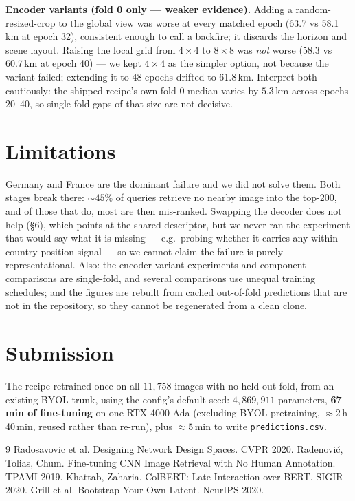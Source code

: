 \documentclass[10pt,a4paper,twocolumn]{article}
\begin{document}
\textbf{Encoder variants (fold 0 only --- weaker evidence).} Adding a
random-resized-crop to the global view was worse at every matched epoch
(63.7 vs 58.1\,km at epoch 32), consistent enough to call a backfire; it
discards the horizon and scene layout. Raising the local grid from
$4\!\times\!4$ to $8\!\times\!8$ was \emph{not} worse (58.3 vs 60.7\,km at
epoch 40) --- we kept $4\!\times\!4$ as the simpler option, not because the
variant failed; extending it to 48 epochs drifted to 61.8\,km. Interpret both
cautiously: the shipped recipe's own fold-0 median varies by $5.3$\,km across
epochs 20--40, so single-fold gaps of that size are not decisive.

\section{Limitations}

Germany and France are the dominant failure and we did not solve them. Both
stages break there: ${\sim}45\%$ of queries retrieve no nearby image into the
top-200, and of those that do, most are then mis-ranked. Swapping the decoder
does not help (\S6), which points at the shared descriptor, but we never ran
the experiment that would say what it is missing --- e.g.\ probing whether it
carries any within-country position signal --- so we cannot claim the failure
is purely representational. Also: the encoder-variant experiments and component
comparisons are single-fold, and several comparisons use unequal training
schedules; and the figures are rebuilt from
cached out-of-fold predictions that are not in the repository, so they cannot
be regenerated from a clean clone.

\section{Submission}

The recipe retrained once on all $11{,}758$ images with no held-out fold, from
an existing BYOL trunk, using the config's default seed: $4{,}869{,}911$
parameters, \textbf{67\,min of fine-tuning} on one RTX 4000 Ada (excluding BYOL
pretraining, ${\approx}2$\,h\,40\,min, reused rather than re-run), plus
${\approx}5$\,min to write \texttt{predictions.csv}.

{\footnotesize
\renewcommand{\refname}{\vspace{-1.2em}}
\begin{thebibliography}{9}
\setlength{\itemsep}{0pt}\setlength{\parskip}{0pt}
 Radosavovic et al. Designing Network Design Spaces. CVPR 2020.
 Radenovi\'c, Tolias, Chum. Fine-tuning CNN Image Retrieval with No Human Annotation. TPAMI 2019.
 Khattab, Zaharia. ColBERT: Late Interaction over BERT. SIGIR 2020.
 Grill et al. Bootstrap Your Own Latent. NeurIPS 2020.
\end{thebibliography}}
\end{document}
